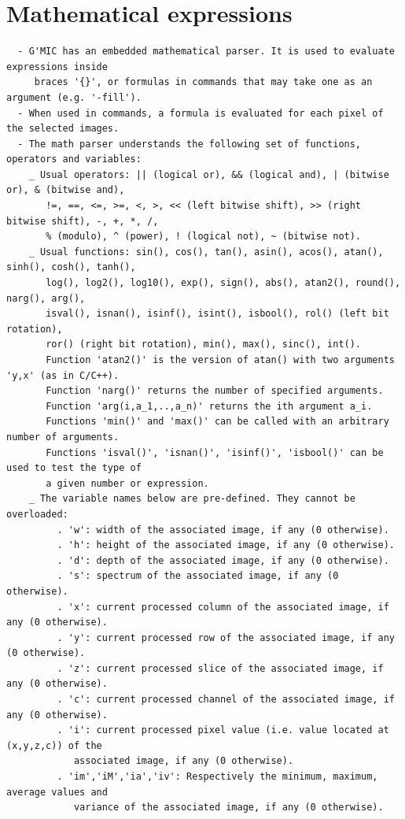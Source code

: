 \documentclass[a4paper,11pt,twoside]{book}
\begin{document}
\section{Mathematical expressions}
\small
\begin{lstlisting}
  - G'MIC has an embedded mathematical parser. It is used to evaluate expressions inside 
     braces '{}', or formulas in commands that may take one as an argument (e.g. '-fill'). 
  - When used in commands, a formula is evaluated for each pixel of the selected images. 
  - The math parser understands the following set of functions, operators and variables: 
    _ Usual operators: || (logical or), && (logical and), | (bitwise or), & (bitwise and), 
       !=, ==, <=, >=, <, >, << (left bitwise shift), >> (right bitwise shift), -, +, *, /, 
       % (modulo), ^ (power), ! (logical not), ~ (bitwise not). 
    _ Usual functions: sin(), cos(), tan(), asin(), acos(), atan(), sinh(), cosh(), tanh(), 
       log(), log2(), log10(), exp(), sign(), abs(), atan2(), round(), narg(), arg(), 
       isval(), isnan(), isinf(), isint(), isbool(), rol() (left bit rotation), 
       ror() (right bit rotation), min(), max(), sinc(), int(). 
       Function 'atan2()' is the version of atan() with two arguments 'y,x' (as in C/C++). 
       Function 'narg()' returns the number of specified arguments. 
       Function 'arg(i,a_1,..,a_n)' returns the ith argument a_i. 
       Functions 'min()' and 'max()' can be called with an arbitrary number of arguments. 
       Functions 'isval()', 'isnan()', 'isinf()', 'isbool()' can be used to test the type of 
       a given number or expression. 
    _ The variable names below are pre-defined. They cannot be overloaded: 
         . 'w': width of the associated image, if any (0 otherwise). 
         . 'h': height of the associated image, if any (0 otherwise). 
         . 'd': depth of the associated image, if any (0 otherwise). 
         . 's': spectrum of the associated image, if any (0 otherwise). 
         . 'x': current processed column of the associated image, if any (0 otherwise). 
         . 'y': current processed row of the associated image, if any (0 otherwise). 
         . 'z': current processed slice of the associated image, if any (0 otherwise). 
         . 'c': current processed channel of the associated image, if any (0 otherwise). 
         . 'i': current processed pixel value (i.e. value located at (x,y,z,c)) of the 
            associated image, if any (0 otherwise). 
         . 'im','iM','ia','iv': Respectively the minimum, maximum, average values and 
            variance of the associated image, if any (0 otherwise). 

\end{lstlisting}
\end{document}
